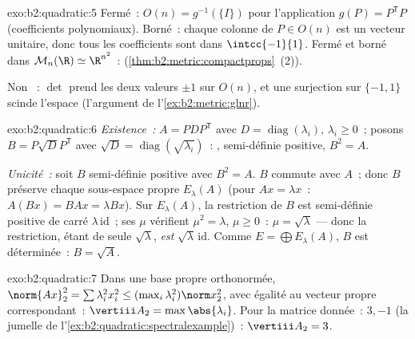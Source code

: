 \begin{solution}{exo:b2:quadratic:5}
Fermé~: $O(n) = g^{-1}(\{I\})$ pour l'application  $g(P) =
P^{\mathsf T}P$ (coefficients polynomiaux). Borné~: chaque colonne
de $P \in O(n)$ est un vecteur unitaire, donc tous les coefficients
sont dans $\intcc{-1}{1}$. Fermé et borné dans $\mathcal{M}_n(\R)
\simeq \R^{n^2}$~:  (\cref{thm:b2:metric:compactprops}~(2)).

Non ~: $\det$ prend les deux valeurs $\pm1$ sur $O(n)$, et
une surjection  sur $\{-1, 1\}$ scinde l'espace
(l'argument de l'\cref{ex:b2:metric:glnr}).
\end{solution}

\begin{solution}{exo:b2:quadratic:6}
\emph{Existence~:} $A = PDP^{\mathsf T}$ avec $D =
\operatorname{diag}(\lambda_i)$, $\lambda_i \geq 0$~; posons $B =
P\sqrt D P^{\mathsf T}$ avec $\sqrt D =
\operatorname{diag}(\sqrt{\lambda_i})$~: , semi-définie
positive, $B^2 = A$.

\emph{Unicité~:} soit $B$  semi-définie positive avec $B^2
= A$. $B$ commute avec $A$~; donc $B$ préserve chaque sous-espace
propre $E_\lambda(A)$ (pour $Ax = \lambda x$~: $A(Bx) = BAx =
\lambda Bx$). Sur $E_\lambda(A)$, la restriction de $B$ est
 semi-définie positive de carré $\lambda\,\mathrm{id}$~;
ses  $\mu$ vérifient $\mu^2 = \lambda$, $\mu \geq 0$~:
$\mu = \sqrt\lambda$ --- donc la restriction, étant 
de seule  $\sqrt\lambda$, \emph{est}
$\sqrt\lambda\,\mathrm{id}$. Comme $E = \bigoplus E_\lambda(A)$, $B$
est déterminée~: $B = \sqrt A$.
\end{solution}

\begin{solution}{exo:b2:quadratic:7}
Dans une base propre orthonormée, $\norm{Ax}_2^2 = \sum \lambda_i^2
x_i^2 \leq (\max_i \lambda_i^2)\norm x_2^2$, avec égalité au
vecteur propre correspondant~: $\vertiii A_2 = \max\abs{\lambda_i}$.
Pour la matrice donnée~:  $3, -1$
(la jumelle de l'\cref{ex:b2:quadratic:spectralexample})~:
$\vertiii A_2 = 3$.
\end{solution}


